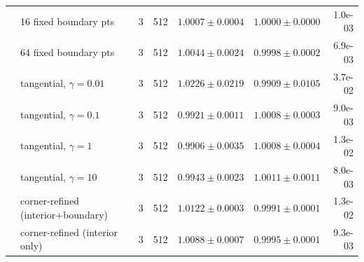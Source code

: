 \begin{tabular}{llrrrrr}
 & 16 fixed boundary pts & 3 & 512 & $1.0007\pm0.0004$ & $1.0000\pm0.0000$ & 1.0e-03 \\
 & 64 fixed boundary pts & 3 & 512 & $1.0044\pm0.0024$ & $0.9998\pm0.0002$ & 6.9e-03 \\
 & tangential, $\gamma{=}0.01$ & 3 & 512 & $1.0226\pm0.0219$ & $0.9909\pm0.0105$ & 3.7e-02 \\
 & tangential, $\gamma{=}0.1$ & 3 & 512 & $0.9921\pm0.0011$ & $1.0008\pm0.0003$ & 9.0e-03 \\
 & tangential, $\gamma{=}1$ & 3 & 512 & $0.9906\pm0.0035$ & $1.0008\pm0.0004$ & 1.3e-02 \\
 & tangential, $\gamma{=}10$ & 3 & 512 & $0.9943\pm0.0023$ & $1.0011\pm0.0011$ & 8.0e-03 \\
 & corner-refined (interior+boundary) & 3 & 512 & $1.0122\pm0.0003$ & $0.9991\pm0.0001$ & 1.3e-02 \\
 & corner-refined (interior only) & 3 & 512 & $1.0088\pm0.0007$ & $0.9995\pm0.0001$ & 9.3e-03 \\
\bottomrule
\end{tabular}
